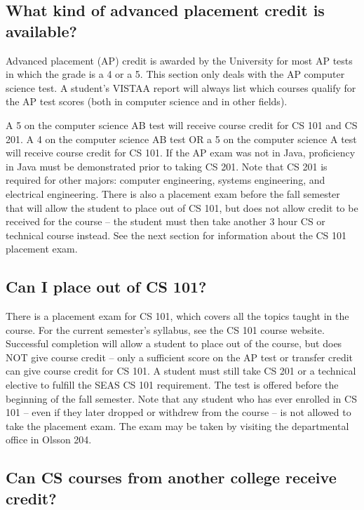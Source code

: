 \documentclass[12pt,twoside]{article}
\begin{document}
\subsection{What kind of  advanced placement credit is available?}

Advanced placement (AP) credit is awarded by the University for most
AP tests in which the grade is a 4 or a 5.  This section only deals
with the AP computer science test.  A student's VISTAA report will
always list which courses qualify for the AP test scores (both in
computer science and in other fields).

A 5 on the computer science AB test will receive course credit for CS
101 and CS 201.  A 4 on the computer science AB test OR a 5 on the
computer science A test will receive course credit for CS 101.  If the
AP exam was not in Java, proficiency in Java must be demonstrated
prior to taking CS 201.  Note that CS 201 is required for other
majors: computer engineering, systems engineering, and electrical
engineering.  There is also a placement exam before the fall semester
that will allow the student to place out of CS 101, but does not allow
credit to be received for the course -- the student must then take
another 3 hour CS or technical course instead.  See the next section
for information about the CS 101 placement exam.

\subsection{Can I  place out of CS 101?}

There is a placement exam for CS 101, which covers all the topics
taught in the course.  For the current semester's syllabus, see the CS
101 course website.  Successful completion will allow a student to
place out of the course, but does NOT give course credit -- only a
sufficient score on the AP test or transfer credit can give course
credit for CS 101.  A student must still take CS 201 or a technical
elective to fulfill the SEAS CS 101 requirement.  The test is offered
before the beginning of the fall semester.  Note that any student who
has ever enrolled in CS 101 -- even if they later dropped or withdrew
from the course -- is not allowed to take the placement exam.  The
exam may be taken by visiting the departmental office in Olsson 204.

\subsection{Can CS courses from another college receive credit?}
\end{document}
